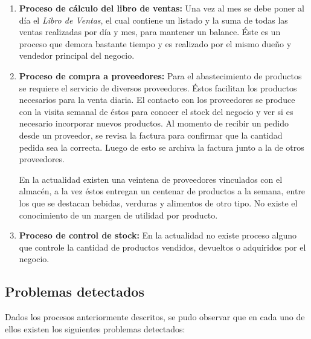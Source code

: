 \documentclass[letterpaper,12pt]{article}
\begin{document}
\begin{enumerate}
\item \textbf{Proceso de cálculo del libro de ventas:}
Una vez al mes se debe poner al día el \emph{Libro de Ventas}, el cual contiene un listado y 
la suma de todas las ventas realizadas por día y mes, para mantener un balance. Éste es un proceso
que demora bastante tiempo y es realizado por el mismo dueño y vendedor principal del negocio.

\item \textbf{Proceso de compra a proveedores:}
Para el abastecimiento de productos se requiere el servicio de diversos proveedores. Éstos
facilitan los productos necesarios para la venta diaria. El contacto con los proveedores se 
produce con la visita semanal de éstos para conocer el stock del negocio y ver si es necesario 
incorporar nuevos productos. Al momento de recibir un pedido desde un proveedor, se revisa la
factura para confirmar que la cantidad pedida sea la correcta. Luego de esto se archiva la factura 
junto a la de otros proveedores.

\newpage

En la actualidad existen una veintena de proveedores vinculados con el almacén, a la vez éstos entregan 
un centenar de productos a la semana, entre los que se destacan bebidas, verduras y alimentos de otro 
tipo. No existe el conocimiento de un margen de utilidad por producto.

\item \textbf{Proceso de control de stock:}
En la actualidad no existe proceso alguno que controle la cantidad de productos vendidos, devueltos o adquiridos
por el negocio.
\end{enumerate}

\newpage

\subsection{Problemas detectados}

Dados los procesos anteriormente descritos, se pudo observar que en cada uno de ellos existen los siguientes 
problemas detectados:
\end{document}
